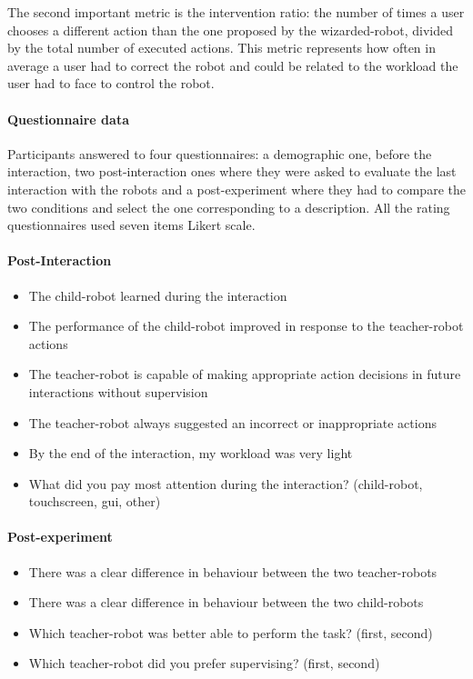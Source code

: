 The second important metric is the intervention ratio: the number of times a user chooses a different action than the one proposed by the wizarded-robot, divided by the total number of executed actions. This metric represents how often in average a user had to correct the robot and could be related to the workload the user had to face to control the robot.

\paragraph{Questionnaire data}
 
Participants answered to four questionnaires: a demographic one, before the interaction, two post-interaction ones where they were asked to evaluate the last interaction with the robots and a post-experiment where they had to compare the two conditions and select the one corresponding to a description. All the rating questionnaires used seven items Likert scale.

\paragraph{Post-Interaction}
\begin{itemize}
	\item The child-robot learned during the interaction
	\item The performance of the child-robot improved in response to the teacher-robot actions
	\item The teacher-robot is capable of making appropriate action decisions in future interactions without supervision
	\item The teacher-robot always suggested an incorrect or inappropriate actions
	\item By the end of the interaction, my workload was very light
	\item What did you pay most attention during the interaction? (child-robot, touchscreen, \gls{gui}, other)
\end{itemize}

\paragraph{Post-experiment}
\begin{itemize}
	\item There was a clear difference in behaviour between the two teacher-robots
	\item There was a clear difference in behaviour between the two child-robots
	\item Which teacher-robot was better able to perform the task? (first, second)
	\item Which teacher-robot did you prefer supervising? (first, second)
\end{itemize}

